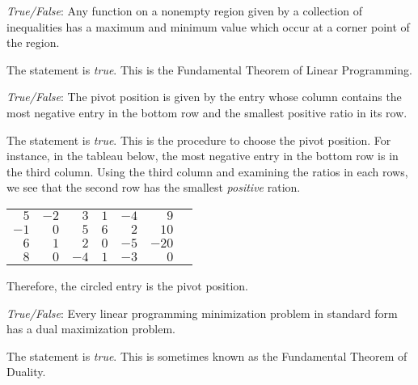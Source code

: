 \documentclass[11pt,letterpaper]{article}
\begin{document}
\newpage



\quizsol \textit{True/False}: Any function on a nonempty region given by a collection of inequalities has a maximum and minimum value which occur at a corner point of the region. \pspace

\sol The statement is \textit{true}. This is the Fundamental Theorem of Linear Programming. \pvspace{1.5cm}



\quizsol \textit{True/False}: The pivot position is given by the entry whose column contains the most negative entry in the bottom row and the smallest positive ratio in its row. \pspace

\sol The statement is \textit{true}. This is the procedure to choose the pivot position. For instance, in the tableau below, the most negative entry in the bottom row is in the third column. Using the third column and examining the ratios in each rows, we see that the second row has the smallest \textit{positive} ration. 
	\begin{table}[!ht]
	\centering
	\begin{tabular}{rrrrr|rr}
	$5$ & $-2$ & $3$ & $1$ & $-4$ & $9$ & \quad {\footnotesize $9/3= 3$} \\
	$-1$ & $0$ & \textcircled{$5$} & $6$ & $2$ & $10$ & \quad {\footnotesize $10/5= 2$} \\
	$6$ & $1$ & $2$ & $0$ & $-5$ & $-20$ & \quad {\footnotesize $-20/2= -10$} \\ \cline{1-6}
	$8$ & $0$ & $-4$ & $1$ & $-3$ & $0$ & \\
	\end{tabular}
	\end{table} \par
Therefore, the circled entry is the pivot position. \pvspace{1.5cm}



\quizsol \textit{True/False}: Every linear programming minimization problem in standard form has a dual maximization problem. \pspace

\sol The statement is \textit{true}. This is sometimes known as the Fundamental Theorem of Duality. \pvspace{1.5cm}
\end{document}
